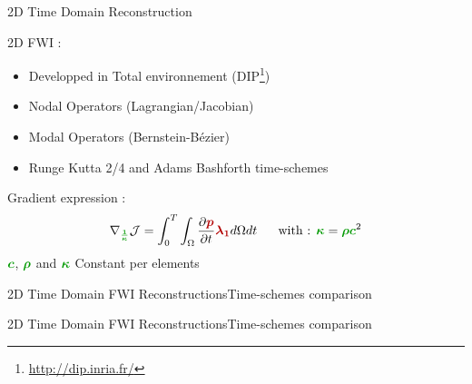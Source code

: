 \begin{frame}[noframenumbering]{2D Time Domain Reconstruction}

2D FWI :
\begin{itemize}
\item Developped in Total environnement (DIP\footnote{\url{http://dip.inria.fr/}})
\item Nodal Operators (Lagrangian/Jacobian)
\item Modal Operators (Bernstein-Bézier)
\item Runge Kutta 2/4 and Adams Bashforth time-schemes
\end{itemize}
\vspace{0.5cm}
 Gradient expression :
  \begin{equation}
     \nabla_{\boldsymbol{\textcolor{\mygreen}{\frac{1}{\kappa}}}}\CF=\int_0^{T} \int_{\Omega} \frac{\partial \contP}{\partial t}\Lbdun d\Omega dt \text{~~~~ with : } \boldsymbol{\textcolor{\mygreen}{\kappa}}=\density \velocity^2
  \end{equation}
   $\velocity$, $\density$ and  $\boldsymbol{\textcolor{\mygreen}{\kappa}}$  Constant per elements
\end{frame}







\newlength{\modelwidth}
\setlength{\modelwidth}{10.8cm}
\newcommand{\modeltitle}{Initial $\velocity$ Model}

\begin{frame}{2D Time Domain FWI Reconstructions}{Time-schemes comparison}
  \vspace{-0.5cm}
  \renewcommand{\modelfile}{fig/marmousi_noise_ini}
  \begin{figure}
        \hfill
  \end{figure}
  \vspace{-1cm}
  \renewcommand{\modeltitle}{Target $\velocity$ Model}
  \renewcommand{\modelfile}{fig/marmousi_target}
  \begin{figure}
        \hfill
   \end{figure}
\end{frame}

\begin{frame}[noframenumbering]{2D Time Domain FWI Reconstructions}{Time-schemes comparison}
  \vspace{-0.5cm}
  \renewcommand{\modelfile}{fig/marmousi_noise_rk2}
  \renewcommand{\modeltitle}{\textbf{\textcolor{red}{RK2}} Reconstructed $\velocity$ Model (30 iterations)}
  \begin{figure}
     \hfill
  \end{figure}
  \vspace{-1cm}
  \renewcommand{\modeltitle}{Target $\velocity$ Model}
  \renewcommand{\modelfile}{fig/marmousi_target}
  \begin{figure}
     \hfill
  \end{figure}
\end{frame}

